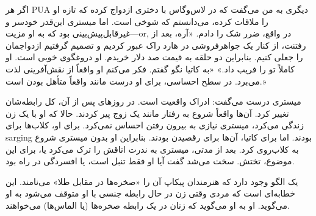 اگر هر  PUA دیگری به من می‌گفت که در لاس‌وگاس با دختری ازدواج کرده که تازه او را ملاقات کرده، می‌دانستم که شوخی است. اما میستری این‌قدر خودسر و غیرقابل‌پیش‌بینی بود که به او مزیت—or, در واقع، ضرر شک را دادم.  
«آره، بعد از رفتنت، از کنار یک جواهرفروشی در هارد راک عبور کردیم و تصمیم گرفتیم ازدواجمان را جعلی کنیم. بنابراین دو حلقه به قیمت صد دلار خریدم. او دروغگوی خوبی است. او کاملاً تو را فریب داد.»  
«به کاتیا نگو گفتم. فکر می‌کنم او واقعاً از نقش‌آفرینی لذت می‌برد. در سطح احساسی، برای او درست مانند واقعاً متأهل بودن است.»  

میستری درست می‌گفت: ادراک واقعیت است. در روزهای پس از آن، کل رابطه‌شان تغییر کرد. آن‌ها واقعاً شروع به رفتار مانند یک زوج پیر کردند.  
حالا که او با یک زن زندگی می‌کرد، میستری نیازی به بیرون رفتن احساس نمی‌کرد. برای او، کلاب‌ها برای  sarging بودند. اما برای کاتیا، آن‌ها برای رقصیدن بودند. بنابراین او بدون میستری شروع به کلاب‌روی کرد. بعد از مدتی، میستری به ندرت اتاقش را ترک می‌کرد یا، برای این موضوع، تختش. سخت می‌شد گفت آیا او فقط تنبل است، یا افسردگی در راه بود.  

یک الگو وجود دارد که هنرمندان پیکاپ آن را «صخره‌ها در مقابل طلا» می‌نامند. این خطابه‌ای است که مردی وقتی زن در حال رابطه جنسی با او متوقف می‌شود به او می‌گوید. او به او می‌گوید که زنان در یک رابطه صخره‌ها (یا الماس‌ها) می‌خواهند.